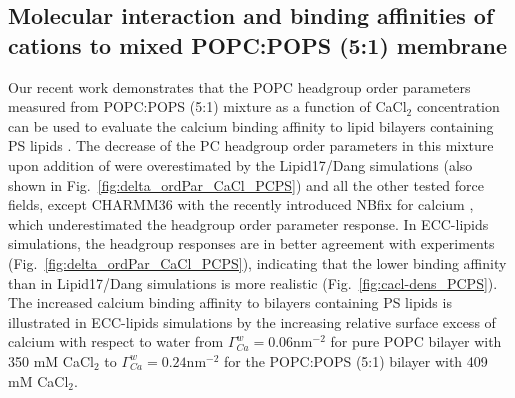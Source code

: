 \documentclass[journal=jpcbfk,manuscript=article]{achemso}
\begin{document}
\subsection{Molecular interaction and binding affinities of  cations to mixed POPC:POPS (5:1) membrane} 
\label{section:lip-ion_ca}

Our recent work demonstrates that the POPC headgroup order parameters measured
from POPC:POPS (5:1) mixture as a function of CaCl$_2$ concentration \cite{roux90}
can be used to evaluate the calcium binding affinity to lipid bilayers containing PS lipids \cite{NMRlipidsIV}.
The decrease of the PC headgroup order parameters in this mixture upon addition of  
were overestimated by the Lipid17/Dang simulations (also shown in Fig.~\ref{fig:delta_ordPar_CaCl_PCPS})
and all the other tested force fields, except CHARMM36 with the recently introduced NBfix for calcium \cite{kim16},
which underestimated the headgroup order parameter response.
In ECC-lipids simulations, the headgroup responses are in better agreement with experiments (Fig.~\ref{fig:delta_ordPar_CaCl_PCPS}),
indicating that the lower binding affinity than in Lipid17/Dang simulations is more realistic (Fig.~\ref{fig:cacl-dens_PCPS}).
The increased calcium binding affinity to bilayers containing PS lipids is illustrated in
ECC-lipids simulations by the increasing relative surface excess of calcium with respect to water from
$\Gamma^{w}_{Ca} = 0.06\mathrm{nm^{-2}}$ for pure POPC bilayer with 350 mM CaCl$_2$ \cite{melcr18}
to $\Gamma^{w}_{Ca} = 0.24\mathrm{nm^{-2}}$ for the POPC:POPS (5:1) bilayer with 409 mM CaCl$_2$.

\end{document}
